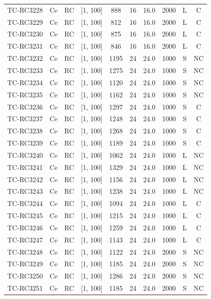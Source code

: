 \begin{longtable}{lccccccccc}
TC-RC3228 & Ce & RC & [1, 100] & 888 & 16 & 16.0 & 2000 & L & C \\
TC-RC3229 & Ce & RC & [1, 100] & 812 & 16 & 16.0 & 2000 & L & C \\
TC-RC3230 & Ce & RC & [1, 100] & 875 & 16 & 16.0 & 2000 & L & C \\
TC-RC3231 & Ce & RC & [1, 100] & 846 & 16 & 16.0 & 2000 & L & C \\
TC-RC3232 & Ce & RC & [1, 100] & 1195 & 24 & 24.0 & 1000 & S & NC \\
TC-RC3233 & Ce & RC & [1, 100] & 1275 & 24 & 24.0 & 1000 & S & NC \\
TC-RC3234 & Ce & RC & [1, 100] & 1120 & 24 & 24.0 & 1000 & S & NC \\
TC-RC3235 & Ce & RC & [1, 100] & 1162 & 24 & 24.0 & 1000 & S & NC \\
TC-RC3236 & Ce & RC & [1, 100] & 1297 & 24 & 24.0 & 1000 & S & C \\
TC-RC3237 & Ce & RC & [1, 100] & 1248 & 24 & 24.0 & 1000 & S & C \\
TC-RC3238 & Ce & RC & [1, 100] & 1268 & 24 & 24.0 & 1000 & S & C \\
TC-RC3239 & Ce & RC & [1, 100] & 1189 & 24 & 24.0 & 1000 & S & C \\
TC-RC3240 & Ce & RC & [1, 100] & 1062 & 24 & 24.0 & 1000 & L & NC \\
TC-RC3241 & Ce & RC & [1, 100] & 1329 & 24 & 24.0 & 1000 & L & NC \\
TC-RC3242 & Ce & RC & [1, 100] & 1156 & 24 & 24.0 & 1000 & L & NC \\
TC-RC3243 & Ce & RC & [1, 100] & 1238 & 24 & 24.0 & 1000 & L & NC \\
TC-RC3244 & Ce & RC & [1, 100] & 1094 & 24 & 24.0 & 1000 & L & C \\
TC-RC3245 & Ce & RC & [1, 100] & 1215 & 24 & 24.0 & 1000 & L & C \\
TC-RC3246 & Ce & RC & [1, 100] & 1259 & 24 & 24.0 & 1000 & L & C \\
TC-RC3247 & Ce & RC & [1, 100] & 1143 & 24 & 24.0 & 1000 & L & C \\
TC-RC3248 & Ce & RC & [1, 100] & 1122 & 24 & 24.0 & 2000 & S & NC \\
TC-RC3249 & Ce & RC & [1, 100] & 1185 & 24 & 24.0 & 2000 & S & NC \\
TC-RC3250 & Ce & RC & [1, 100] & 1286 & 24 & 24.0 & 2000 & S & NC \\
TC-RC3251 & Ce & RC & [1, 100] & 1185 & 24 & 24.0 & 2000 & S & NC \\

\end{longtable}
